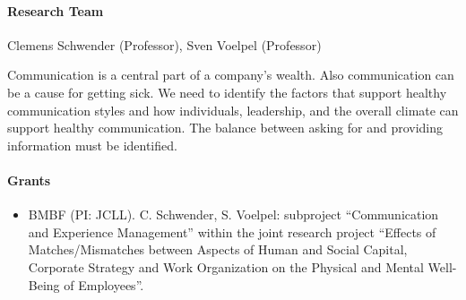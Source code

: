 
\paragraph{Research Team}
Clemens Schwender (Professor), Sven Voelpel (Professor)

 Communication is a central part of a company's wealth. Also communication can be a cause for getting sick. We need to identify the factors that support healthy communication styles and how individuals, leadership, and the overall climate can support healthy communication. The balance between asking for and providing information must be identified.
 
\paragraph{Grants}
\begin{itemize}
\item BMBF (PI: JCLL). C. Schwender, S. Voelpel: subproject ``Communication and Experience Management'' within the joint research project ``Effects of Matches/Mismatches between Aspects of Human and Social Capital, Corporate Strategy and Work Organization on the Physical and Mental Well-Being of Employees''.  
\end{itemize}